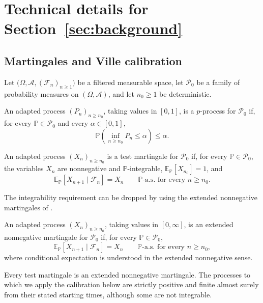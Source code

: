 \section{Technical details for Section~\ref{sec:background}}
\label{app:background-details}

\subsection{Martingales and Ville calibration}
\label{app:calibration-details}

Let \(\bigl(\Omega,\mathcal A,(\mathcal F_n)_{n\geq1}\bigr)\) be a
filtered measurable space, let \(\mathcal P_0\) be a family of
probability measures on \((\Omega,\mathcal A)\), and let
\(n_0\geq1\) be deterministic.

\begin{definition}[\(p\)-process]
An adapted process \((P_n)_{n\geq n_0}\), taking values in \([0,1]\),
is a \(p\)-process for \(\mathcal P_0\) if, for every
\(\mathbb P\in\mathcal P_0\) and every \(\alpha\in[0,1]\),
\[
  \mathbb P\left(\inf_{n\geq n_0}P_n\leq\alpha\right)
  \leq\alpha.
\]
\end{definition}

\begin{definition}
An adapted process \((X_n)_{n\geq n_0}\) is a test martingale for
\(\mathcal P_0\) if, for every \(\mathbb P\in\mathcal P_0\), the
variables \(X_n\) are nonnegative and \(\mathbb P\)-integrable,
\(\mathbb E_{\mathbb P}[X_{n_0}]=1\), and
\[
  \mathbb E_{\mathbb P}
  \left[X_{n+1}\mid\mathcal F_n\right]
  =X_n
  \qquad
  \mathbb P\text{-a.s. for every }n\geq n_0.
\]
\end{definition}

The integrability requirement can be dropped by using the extended
nonnegative martingales of \citet{Wang2025a}.

\begin{definition}
An adapted process \((X_n)_{n\geq n_0}\), taking values in
\([0,\infty]\), is an extended nonnegative martingale for
\(\mathcal P_0\) if, for every \(\mathbb P\in\mathcal P_0\),
\[
  \mathbb E_{\mathbb P}
  \left[X_{n+1}\mid\mathcal F_n\right]
  =X_n
  \qquad
  \mathbb P\text{-a.s. for every }n\geq n_0,
\]
where conditional expectation is understood in the extended
nonnegative sense.
\end{definition}

Every test martingale is an extended nonnegative martingale. The
processes to which we apply the calibration below are strictly positive
and finite almost surely from their stated starting times, although
some are not integrable.

